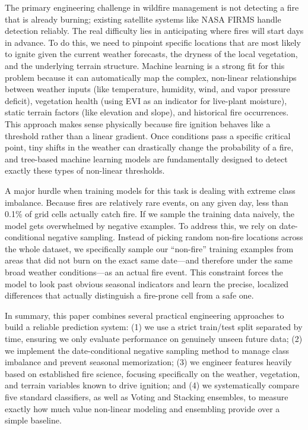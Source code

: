 \documentclass[11pt]{article}
\begin{document}
The primary engineering challenge in wildfire management is not detecting a fire that is already burning; existing satellite systems like NASA FIRMS handle detection reliably. The real difficulty lies in anticipating where fires will start days in advance. To do this, we need to pinpoint specific locations that are most likely to ignite given the current weather forecasts, the dryness of the local vegetation, and the underlying terrain structure. Machine learning is a strong fit for this problem because it can automatically map the complex, non-linear relationships between weather inputs (like temperature, humidity, wind, and vapor pressure deficit), vegetation health (using EVI as an indicator for live-plant moisture), static terrain factors (like elevation and slope), and historical fire occurrences. This approach makes sense physically because fire ignition behaves like a threshold rather than a linear gradient. Once conditions pass a specific critical point, tiny shifts in the weather can drastically change the probability of a fire, and tree-based machine learning models are fundamentally designed to detect exactly these types of non-linear thresholds.

A major hurdle when training models for this task is dealing with extreme class imbalance. Because fires are relatively rare events, on any given day, less than 0.1\% of grid cells actually catch fire. If we sample the training data naively, the model gets overwhelmed by negative examples. To address this, we rely on date-conditional negative sampling. Instead of picking random non-fire locations across the whole dataset, we specifically sample our ``non-fire'' training examples from areas that did not burn on the exact same date—and therefore under the same broad weather conditions—as an actual fire event. This constraint forces the model to look past obvious seasonal indicators and learn the precise, localized differences that actually distinguish a fire-prone cell from a safe one.

In summary, this paper combines several practical engineering approaches to build a reliable prediction system: (1) we use a strict train/test split separated by time, ensuring we only evaluate performance on genuinely unseen future data; (2) we implement the date-conditional negative sampling method to manage class imbalance and prevent seasonal memorization; (3) we engineer features heavily based on established fire science, focusing specifically on the weather, vegetation, and terrain variables known to drive ignition; and (4) we systematically compare five standard classifiers, as well as Voting and Stacking ensembles, to measure exactly how much value non-linear modeling and ensembling provide over a simple baseline.
\end{document}
